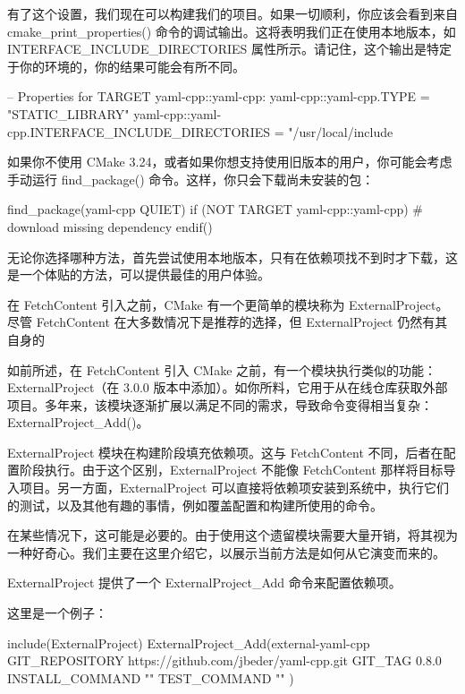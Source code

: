 有了这个设置，我们现在可以构建我们的项目。如果一切顺利，你应该会看到来自 cmake\_print\_properties() 命令的调试输出。这将表明我们正在使用本地版本，如 INTERFACE\_INCLUDE\_DIRECTORIES 属性所示。请记住，这个输出是特定于你的环境的，你的结果可能会有所不同。

\begin{shell}
--
    Properties for TARGET yaml-cpp::yaml-cpp:
        yaml-cpp::yaml-cpp.TYPE = "STATIC_LIBRARY"
        yaml-cpp::yaml-cpp.INTERFACE_INCLUDE_DIRECTORIES =
                                                    "/usr/local/include
\end{shell}

如果你不使用 CMake 3.24，或者如果你想支持使用旧版本的用户，你可能会考虑手动运行 find\_package() 命令。这样，你只会下载尚未安装的包：

\begin{cmake}
find_package(yaml-cpp QUIET)
if (NOT TARGET yaml-cpp::yaml-cpp)
    # download missing dependency
endif()
\end{cmake}

无论你选择哪种方法，首先尝试使用本地版本，只有在依赖项找不到时才下载，这是一个体贴的方法，可以提供最佳的用户体验。

在 FetchContent 引入之前，CMake 有一个更简单的模块称为 ExternalProject。尽管 FetchContent 在大多数情况下是推荐的选择，但 ExternalProject 仍然有其自身的


如前所述，在 FetchContent 引入 CMake 之前，有一个模块执行类似的功能：ExternalProject（在 3.0.0 版本中添加）。如你所料，它用于从在线仓库获取外部项目。多年来，该模块逐渐扩展以满足不同的需求，导致命令变得相当复杂：ExternalProject\_Add()。

ExternalProject 模块在构建阶段填充依赖项。这与 FetchContent 不同，后者在配置阶段执行。由于这个区别，ExternalProject 不能像 FetchContent 那样将目标导入项目。另一方面，ExternalProject 可以直接将依赖项安装到系统中，执行它们的测试，以及其他有趣的事情，例如覆盖配置和构建所使用的命令。

在某些情况下，这可能是必要的。由于使用这个遗留模块需要大量开销，将其视为一种好奇心。我们主要在这里介绍它，以展示当前方法是如何从它演变而来的。

ExternalProject 提供了一个 ExternalProject\_Add 命令来配置依赖项。

这里是一个例子：

\begin{cmake}
include(ExternalProject)
ExternalProject_Add(external-yaml-cpp
    GIT_REPOSITORY   https://github.com/jbeder/yaml-cpp.git
    GIT_TAG          0.8.0
    INSTALL_COMMAND  ""
    TEST_COMMAND     ""
)
\end{cmake}

